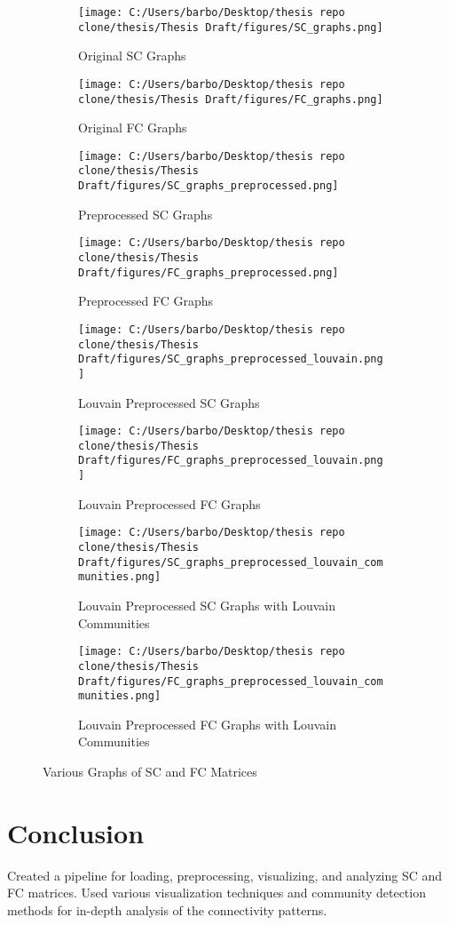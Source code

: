 \begin{figure}[h!]
    \centering
    \begin{subfigure}[b]{0.45\textwidth}
        \texttt{[image: C:/Users/barbo/Desktop/thesis repo clone/thesis/Thesis Draft/figures/SC\_graphs.png]}
        \caption{Original SC Graphs}
    \end{subfigure}
    \begin{subfigure}[b]{0.45\textwidth}
        \texttt{[image: C:/Users/barbo/Desktop/thesis repo clone/thesis/Thesis Draft/figures/FC\_graphs.png]}
        \caption{Original FC Graphs}
    \end{subfigure}
    
    \begin{subfigure}[b]{0.45\textwidth}
        \texttt{[image: C:/Users/barbo/Desktop/thesis repo clone/thesis/Thesis Draft/figures/SC\_graphs\_preprocessed.png]}
        \caption{Preprocessed SC Graphs}
    \end{subfigure}
    \begin{subfigure}[b]{0.45\textwidth}
        \texttt{[image: C:/Users/barbo/Desktop/thesis repo clone/thesis/Thesis Draft/figures/FC\_graphs\_preprocessed.png]}
        \caption{Preprocessed FC Graphs}
    \end{subfigure}
    
    \begin{subfigure}[b]{0.45\textwidth}
        \texttt{[image: C:/Users/barbo/Desktop/thesis repo clone/thesis/Thesis Draft/figures/SC\_graphs\_preprocessed\_louvain.png]}
        \caption{Louvain Preprocessed SC Graphs}
    \end{subfigure}
    \begin{subfigure}[b]{0.45\textwidth}
        \texttt{[image: C:/Users/barbo/Desktop/thesis repo clone/thesis/Thesis Draft/figures/FC\_graphs\_preprocessed\_louvain.png]}
        \caption{Louvain Preprocessed FC Graphs}
    \end{subfigure}
    
    \begin{subfigure}[b]{0.45\textwidth}
        \texttt{[image: C:/Users/barbo/Desktop/thesis repo clone/thesis/Thesis Draft/figures/SC\_graphs\_preprocessed\_louvain\_communities.png]}
        \caption{Louvain Preprocessed SC Graphs with Louvain Communities}
    \end{subfigure}
    \begin{subfigure}[b]{0.45\textwidth}
        \texttt{[image: C:/Users/barbo/Desktop/thesis repo clone/thesis/Thesis Draft/figures/FC\_graphs\_preprocessed\_louvain\_communities.png]}
        \caption{Louvain Preprocessed FC Graphs with Louvain Communities}
    \end{subfigure}
    
    \caption{Various Graphs of SC and FC Matrices}
\end{figure}


\section{Conclusion}
Created a pipeline for loading, preprocessing, visualizing, and analyzing SC and FC matrices. Used various visualization techniques and community detection methods for in-depth analysis of the connectivity patterns.








